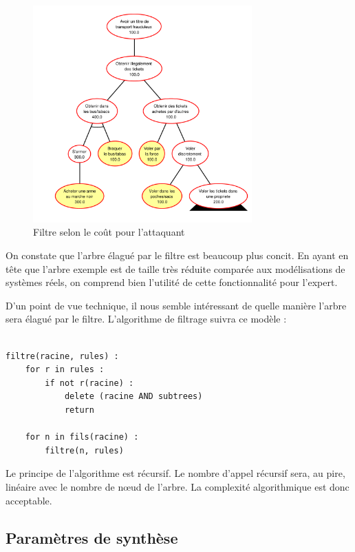 		\begin{figure}[h!]
			\begin{center}
				\includegraphics[width=0.75\textwidth]{figure/post_filtre.pdf}
			\end{center}
			\caption{Filtre selon le coût pour l'attaquant}
			\label{fig:arbre_post_filtre}
		\end{figure}

		On constate que l'arbre élagué par le filtre est beaucoup plus concit. En ayant en tête que l'arbre exemple est de taille très réduite comparée aux modélisations de systèmes réels, on comprend bien l'utilité de cette fonctionnalité pour l'expert.   

		D'un point de vue technique, il nous semble intéressant de quelle manière l'arbre sera élagué par le filtre.
		L'algorithme de filtrage suivra ce modèle :

		\begin{lstlisting}

filtre(racine, rules) :
	for r in rules :
		if not r(racine) :
			delete (racine AND subtrees)
			return

	for n in fils(racine) :
		filtre(n, rules)

		\end{lstlisting}
	
		Le principe de l'algorithme est récursif.
		Le nombre d'appel récursif sera, au pire, linéaire avec le nombre de nœud de l'arbre.
		La complexité algorithmique est donc acceptable.

		\subsection{Paramètres de synthèse}
		\label{subsection:synthese} 

